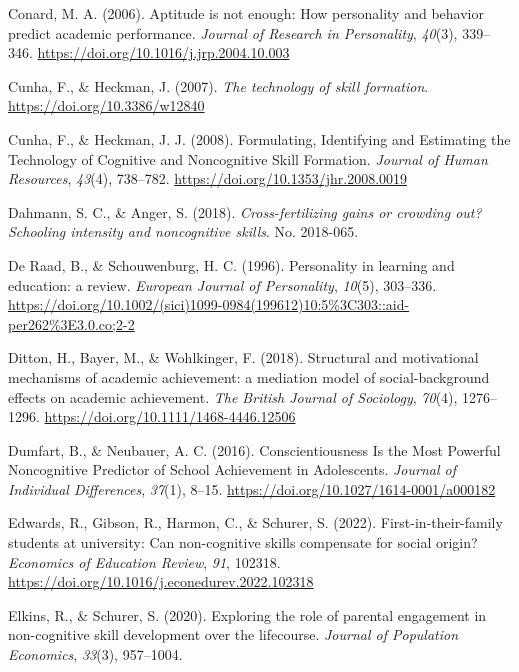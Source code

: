 \documentclass[
  12pt,
  a4paper,
]{article}
\newlength{\cslhangindent}
\newlength{\cslentryspacingunit} %
\newenvironment{CSLReferences}[2] %
 {%
  \setlength{\parindent}{0pt}
  \ifodd #1
  \let\oldpar\par
  \def\par{\hangindent=\cslhangindent\oldpar}
  \fi
  \setlength{\parskip}{#2\cslentryspacingunit}
 }%
 {}
\begin{document}
\begin{CSLReferences}{1}{0}
\leavevmode{}%
Conard, M. A. (2006). Aptitude is not enough: How personality and
behavior predict academic performance. \emph{Journal of Research in
Personality}, \emph{40}(3), 339--346.
\url{https://doi.org/10.1016/j.jrp.2004.10.003}

\leavevmode{}%
Cunha, F., \& Heckman, J. (2007). \emph{The technology of skill
formation}. \url{https://doi.org/10.3386/w12840}

\leavevmode{}%
Cunha, F., \& Heckman, J. J. (2008). Formulating, Identifying and
Estimating the Technology of Cognitive and Noncognitive Skill Formation.
\emph{Journal of Human Resources}, \emph{43}(4), 738--782.
\url{https://doi.org/10.1353/jhr.2008.0019}

\leavevmode{}%
Dahmann, S. C., \& Anger, S. (2018). \emph{Cross-fertilizing gains or
crowding out? Schooling intensity and noncognitive skills}. No.
2018-065.

\leavevmode{}%
De Raad, B., \& Schouwenburg, H. C. (1996). Personality in learning and
education: a review. \emph{European Journal of Personality},
\emph{10}(5), 303--336.
\url{https://doi.org/10.1002/(sici)1099-0984(199612)10:5\%3C303::aid-per262\%3E3.0.co;2-2}

\leavevmode{}%
Ditton, H., Bayer, M., \& Wohlkinger, F. (2018). Structural and
motivational mechanisms of academic achievement: a mediation model of
social{-}background effects on academic achievement. \emph{The British
Journal of Sociology}, \emph{70}(4), 1276--1296.
\url{https://doi.org/10.1111/1468-4446.12506}

\leavevmode{}%
Dumfart, B., \& Neubauer, A. C. (2016). Conscientiousness Is the Most
Powerful Noncognitive Predictor of School Achievement in Adolescents.
\emph{Journal of Individual Differences}, \emph{37}(1), 8--15.
\url{https://doi.org/10.1027/1614-0001/a000182}

\leavevmode{}%
Edwards, R., Gibson, R., Harmon, C., \& Schurer, S. (2022).
First-in-their-family students at university: Can non-cognitive skills
compensate for social origin? \emph{Economics of Education Review},
\emph{91}, 102318.
\url{https://doi.org/10.1016/j.econedurev.2022.102318}

\leavevmode{}%
Elkins, R., \& Schurer, S. (2020). Exploring the role of parental
engagement in non-cognitive skill development over the lifecourse.
\emph{Journal of Population Economics}, \emph{33}(3), 957--1004.


\end{CSLReferences}
\end{document}
